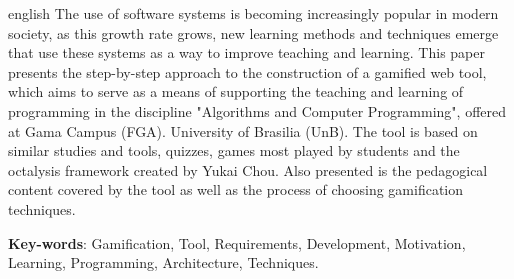 \begin{resumo}[Abstract]
 \begin{otherlanguage*}{english}
  The use of software systems is becoming increasingly popular in modern society, as this growth rate grows, new learning methods and 
  techniques emerge that use these systems as a way to improve teaching and learning. This paper presents the step-by-step approach to the 
  construction of a gamified web tool, which aims to serve as a means of supporting the teaching and learning of programming in the discipline 
  "Algorithms and Computer Programming", offered at Gama Campus (FGA). University of Brasilia (UnB). The tool is based on similar studies and 
  tools, quizzes, games most played by students and the octalysis framework created by Yukai Chou. Also presented is the pedagogical content 
  covered by the tool as well as the process of choosing gamification techniques.

   \vspace{\onelineskip}
 
   \noindent 
   \textbf{Key-words}: Gamification, Tool, Requirements, Development, Motivation, Learning, Programming, Architecture, Techniques.
 \end{otherlanguage*}
\end{resumo}
